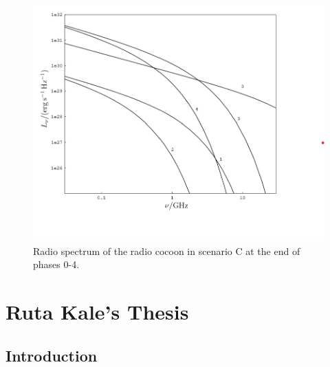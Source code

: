 \documentclass[12pt]{report}
\begin{document}
\begin{itemize}
\begin{figure}[h!]\label{figsceC}
\includegraphics[scale=1]{figsceC.png}
\caption{Radio spectrum of the radio cocoon in scenario C at the end of phases 0-4.  }
\end{figure}
\end{itemize}

\chapter{Ruta Kale's Thesis}
\section{Introduction}
\end{document}
